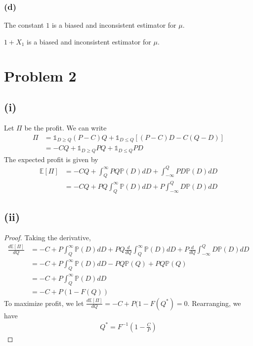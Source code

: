\documentclass[twoside,11pt]{homework}
\begin{document}
\subsubsection*{(d)}
	\begin{claim}
		The constant $1$ is a biased and inconsistent estimator for $\mu$.
	\end{claim}
	\begin{claim}
		$1+X_1$ is a biased and inconsistent estimator for $\mu$.
	\end{claim}
	
\section*{Problem 2} 
\subsection*{(i)}
	Let $\Pi$ be the profit. We can write
	\begin{align*}
		\Pi &= \mathds{1}_{D\geq Q} (P-C)Q + \mathds{1}_{D\leq Q} \left[(P-C)D-C(Q-D)\right] \\
		&= -CQ +\mathds{1}_{D\geq Q} PQ+\mathds{1}_{D\leq Q} PD
	\end{align*}
	The expected profit is given by
	\begin{align*}
		\mathbb{E} [\Pi] &= -CQ+\int_Q^\infty PQ\mathbb{P}(D)dD
		+ \int_{-\infty}^Q PD\mathbb{P}(D)dD \\
		&= -CQ+ PQ\int_Q^\infty \mathbb{P}(D)dD
		+ P\int_{-\infty}^Q D\mathbb{P}(D)dD
	\end{align*}
\subsection*{(ii)}
	\begin{proof}
	Taking the derivative,
	\begin{align*}
		\frac{d\mathbb{E} [\Pi]}{dQ} &= -C + P\int_Q^\infty \mathbb{P}(D)dD
		+ PQ \frac{d}{dQ} \int_Q^\infty \mathbb{P}(D)dD
		+ P \frac{d}{dQ}  \int_{-\infty}^Q D\mathbb{P}(D)dD \\
		&= -C + P\int_Q^\infty \mathbb{P}(D)dD
		- PQ \mathbb{P}(Q)
		+ P Q\mathbb{P}(Q) \tag{Fundamental Theorem of Calculus}\\
		&=-C+P\int_Q^\infty \mathbb{P}(D)dD\\
		&=-C +P(1-F(Q))
	\end{align*}
	To maximize profit, we let $\frac{d\mathbb{E} [\Pi]}{dQ} =-C +P(1-F(Q^*)= 0$. Rearranging, we have
	\begin{align*}
		Q^*= F^{-1}\left(1-\frac{C}{P}\right)
	\end{align*}
	\end{proof}
\end{document}
